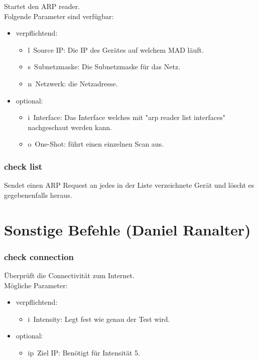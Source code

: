 \documentclass[12pt,a4paper]{report}
\begin{document}
\begin{onehalfspace}
Startet den ARP reader.\\
Folgende Parameter sind verfügbar:
\begin{itemize}
\item verpflichtend:
\begin{itemize}
\item \glqq l\grqq \ Source IP: Die IP des Gerätes auf welchem MAD läuft.
\item \glqq s\grqq \ Subnetzmaske: Die Subnetzmaske für das Netz.
\item \glqq n\grqq \ Netzwerk: die Netzadresse.
\end{itemize}
\item optional:
\begin{itemize}
\item \glqq i\grqq \ Interface: Das Interface welches mit "arp reader list interfaces" nachgeschaut werden kann.
\item \glqq o\grqq \ One-Shot: führt einen einzelnen Scan aus.
\end{itemize}
\end{itemize}

\subsubsection{check list}

Sendet einen ARP Request an jedes in der Liste verzeichnete Gerät und löscht es gegebenenfalls heraus.

\section{Sonstige Befehle (Daniel Ranalter)}

\subsubsection{check connection}

Überprüft die Connectivität zum Internet.\\
Mögliche Parameter:
\begin{itemize}
\item verpflichtend:
\begin{itemize}
\item \glqq i\grqq \ Intensity: Legt fest wie genau der Test wird.
\end{itemize}
\item optional:
\begin{itemize}
\item \glqq ip\grqq \ Ziel IP: Benötigt für Intensität 5.
\end{itemize}
\end{itemize}


\end{onehalfspace}
\end{document}
